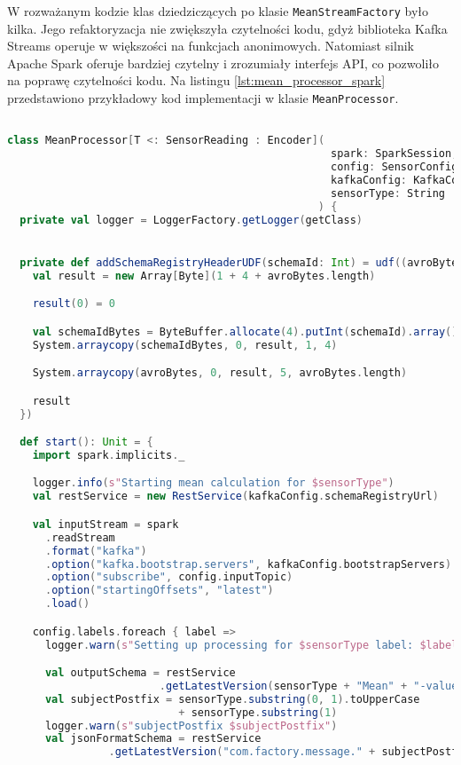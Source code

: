 W rozważanym kodzie klas dziedziczących po klasie \texttt{MeanStreamFactory} było kilka. Jego refaktoryzacja nie zwiększyła czytelności kodu, gdyż biblioteka Kafka Streams \cite{kafka_streams} operuje w większości na funkcjach anonimowych. Natomiast silnik Apache Spark oferuje bardziej czytelny i zrozumiały interfejs API, co pozwoliło na poprawę czytelności kodu. Na listingu \ref{lst:mean_processor_spark} przedstawiono przykładowy kod implementacji w klasie \texttt{MeanProcessor}.

\begin{lstlisting}[caption=Nowa implementacja przetwarzająca strumienie danych, label={lst:mean_processor_spark},language=Scala]

class MeanProcessor[T <: SensorReading : Encoder](
                                                   spark: SparkSession,
                                                   config: SensorConfig,
                                                   kafkaConfig: KafkaConfig,
                                                   sensorType: String
                                                 ) {
  private val logger = LoggerFactory.getLogger(getClass)


  private def addSchemaRegistryHeaderUDF(schemaId: Int) = udf((avroBytes: Array[Byte]) => {
    val result = new Array[Byte](1 + 4 + avroBytes.length)

    result(0) = 0

    val schemaIdBytes = ByteBuffer.allocate(4).putInt(schemaId).array()
    System.arraycopy(schemaIdBytes, 0, result, 1, 4)

    System.arraycopy(avroBytes, 0, result, 5, avroBytes.length)

    result
  })

  def start(): Unit = {
    import spark.implicits._

    logger.info(s"Starting mean calculation for $sensorType")
    val restService = new RestService(kafkaConfig.schemaRegistryUrl)

    val inputStream = spark
      .readStream
      .format("kafka")
      .option("kafka.bootstrap.servers", kafkaConfig.bootstrapServers)
      .option("subscribe", config.inputTopic)
      .option("startingOffsets", "latest")
      .load()

    config.labels.foreach { label =>
      logger.warn(s"Setting up processing for $sensorType label: $label")

      val outputSchema = restService
                        .getLatestVersion(sensorType + "Mean" + "-value")
      val subjectPostfix = sensorType.substring(0, 1).toUpperCase 
                           + sensorType.substring(1)
      logger.warn(s"subjectPostfix $subjectPostfix")
      val jsonFormatSchema = restService
                .getLatestVersion("com.factory.message." + subjectPostfix)


\end{lstlisting}
